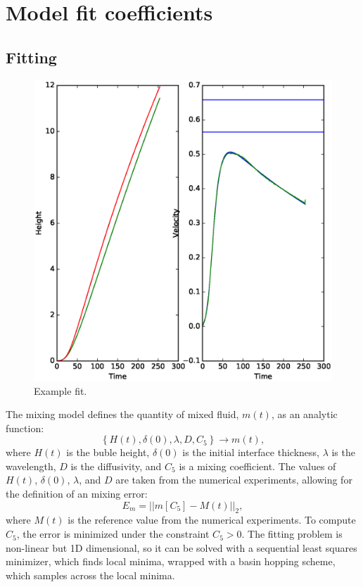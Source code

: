 \section{Model fit coefficients}

\subsection{Fitting}

\begin{figure}
\includegraphics[width=\columnwidth]{figs/H-0.0016-0.0002.eps}
\caption{ 
  Example fit.
}
\end{figure}

The mixing model defines the quantity of mixed fluid, $m(t)$, as an analytic function:
\begin{equation}
\left\{H(t), \delta(0), \lambda, D, C_5\right\} \rightarrow m(t),
\end{equation}
where $H(t)$ is the buble height, 
$\delta(0)$ is the initial interface thickness,
$\lambda$ is the wavelength,
$D$ is the diffusivity, and 
$C_5$ is a mixing coefficient.
The values of $H(t)$, $\delta(0)$, $\lambda$, and $D$ are taken from the numerical experiments, allowing for the definition of an mixing error:
\begin{equation}
E_m = \left|\left|m\left[C_5\right] - M(t) \right| \right|_2,
\end{equation}
where $M(t)$ is the reference value from the numerical experiments.
To compute $C_5$, the error is minimized under the constraint $C_5 > 0$.
The fitting problem is non-linear but 1D dimensional, so it can be solved with a sequential least squares minimizer, which finds local minima, wrapped with a basin hopping scheme, which samples across the local minima.

